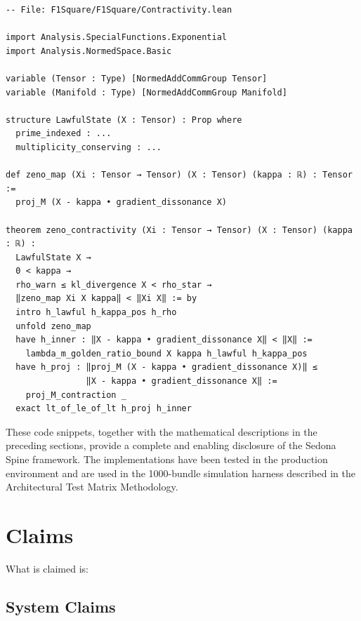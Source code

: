 \documentclass[12pt]{article}
\theoremstyle{plain}
\theoremstyle{definition}
\theoremstyle{remark}
\begin{document}
\begin{lstlisting}[language=lean, caption=Formal Contractivity Proof (Contractivity.lean), label=lst:lean]
-- File: F1Square/F1Square/Contractivity.lean

import Analysis.SpecialFunctions.Exponential
import Analysis.NormedSpace.Basic

variable (Tensor : Type) [NormedAddCommGroup Tensor]
variable (Manifold : Type) [NormedAddCommGroup Manifold]

structure LawfulState (X : Tensor) : Prop where
  prime_indexed : ...
  multiplicity_conserving : ...

def zeno_map (Xi : Tensor → Tensor) (X : Tensor) (kappa : ℝ) : Tensor :=
  proj_M (X - kappa • gradient_dissonance X)

theorem zeno_contractivity (Xi : Tensor → Tensor) (X : Tensor) (kappa : ℝ) :
  LawfulState X →
  0 < kappa →
  rho_warn ≤ kl_divergence X < rho_star →
  ‖zeno_map Xi X kappa‖ < ‖Xi X‖ := by
  intro h_lawful h_kappa_pos h_rho
  unfold zeno_map
  have h_inner : ‖X - kappa • gradient_dissonance X‖ < ‖X‖ :=
    lambda_m_golden_ratio_bound X kappa h_lawful h_kappa_pos
  have h_proj : ‖proj_M (X - kappa • gradient_dissonance X)‖ ≤
                ‖X - kappa • gradient_dissonance X‖ :=
    proj_M_contraction _
  exact lt_of_le_of_lt h_proj h_inner
\end{lstlisting}

\noindent
These code snippets, together with the mathematical descriptions in the preceding sections, provide a complete and enabling disclosure of the Sedona Spine framework. The implementations have been tested in the production environment and are used in the 1000-bundle simulation harness described in the Architectural Test Matrix Methodology.

\section{Claims}

What is claimed is:

\subsection{System Claims}
\end{document}

